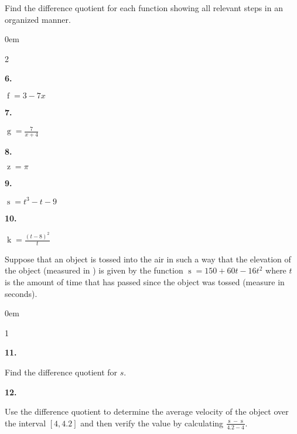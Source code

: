 \documentclass[12pt,]{book}
\theoremstyle{plain}
\theoremstyle{definition}
\numberwithin{equation}{section}
\newenvironment{exercisegroup}%
{\medskip\noindent}%
{\par\bigskip}%
\newlength{\exercisegroupindent}%
\newlength{\exercisegroupitemwidth}%
\newenvironment{exercisegrouplist}%
{\vspace{-\partopsep}%
\begin{adjustwidth}{\exercisegroupindent}{0em}}%
{\end{adjustwidth}%
\vspace{-\partopsep}%
\vspace{\baselineskip}}%
\newenvironment{exercisegroupbycol}[1]%
{\begin{exercisegrouplist}%
\vspace{-\multicolsep}%
\begin{multicols}{#1}%
\setlength{\parindent}{0em}%
\setlength{\exercisegroupitemwidth}{\linewidth}}%
{\end{multicols}%
\vspace{-\multicolsep}%
\end{exercisegrouplist}}%
\newenvironment{exercisegroupitem}[1]%
{\begin{minipage}[t]{\exercisegroupitemwidth}
\vspace{0pt}%
{\bfseries#1}%
\rule{0pt}{\baselineskip}}{\strut%
\end{minipage}%
\hspace{\columnsep}}%
\providecommand\phantomsection{}
\newcommand{\fe}[2]{\mathop{{#1}{\left(#2\right)}}}
\newcommand{\cinterval}[2]{\left[#1,#2\right]}
\begin{document}
\begin{exercisegroup}%
Find the difference quotient for each function showing all relevant steps in an organized manner.%
\par
\begin{exercisegroupbycol}{2}%
\begin{exercisegroupitem}{6. }\phantomsection\hypertarget{exercise-35}{\null}
\(\fe{f}{x}=3-7x\)%
\end{exercisegroupitem}%
\par%
\begin{exercisegroupitem}{7. }\phantomsection\hypertarget{exercise-36}{\null}
\(\fe{g}{x}=\frac{7}{x+4}\)%
\end{exercisegroupitem}%
\par%
\begin{exercisegroupitem}{8. }\phantomsection\hypertarget{exercise-37}{\null}
\(\fe{z}{x}=\pi\)%
\end{exercisegroupitem}%
\par%
\begin{exercisegroupitem}{9. }\phantomsection\hypertarget{exercise-38}{\null}
\(\fe{s}{t}=t^3-t-9\)%
\end{exercisegroupitem}%
\par%
\begin{exercisegroupitem}{10. }\phantomsection\hypertarget{exercise-39}{\null}
\(\fe{k}{t}=\frac{(t-8)^2}{t}\)%
\end{exercisegroupitem}%
\par%
\end{exercisegroupbycol}%
\end{exercisegroup}%
\begin{exercisegroup}%
Suppose that an object is tossed into the air in such a way that the elevation of the object (measured in \si{\foot}) is given by the function \(\fe{s}{t}=150+60t-16t^2\) where \(t\) is the amount of time that has passed since the object was tossed (measure in seconds).%
\par
\begin{exercisegroupbycol}{1}%
\begin{exercisegroupitem}{11. }\phantomsection\hypertarget{exercise-40}{\null}
Find the difference quotient for \(s\).%
\end{exercisegroupitem}%
\par%
\begin{exercisegroupitem}{12. }\phantomsection\hypertarget{exercise-41}{\null}
Use the difference quotient to determine the average velocity of the object over the interval \(\cinterval{4}{4.2}\) and then verify the value by calculating \(\frac{\fe{s}{4.2}-\fe{s}{4}}{4.2-4}\).%
\end{exercisegroupitem}%
\par%
\end{exercisegroupbycol}%
\end{exercisegroup}%
\end{document}
